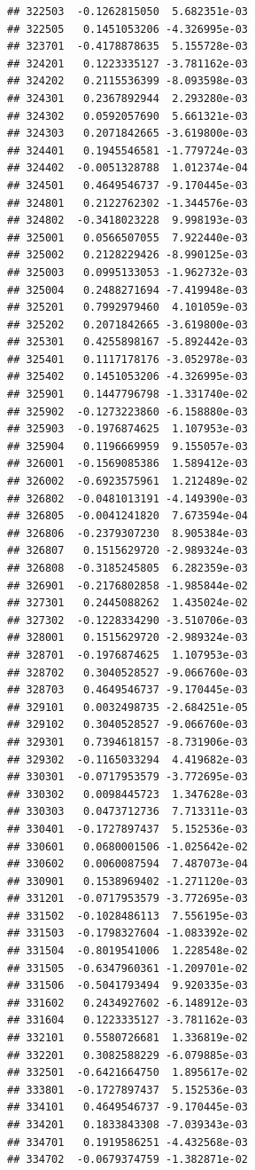 \begin{frame}[fragile]
\begin{verbatim}
## 322503  -0.1262815050  5.682351e-03
## 322505   0.1451053206 -4.326995e-03
## 323701  -0.4178878635  5.155728e-03
## 324201   0.1223335127 -3.781162e-03
## 324202   0.2115536399 -8.093598e-03
## 324301   0.2367892944  2.293280e-03
## 324302   0.0592057690  5.661321e-03
## 324303   0.2071842665 -3.619800e-03
## 324401   0.1945546581 -1.779724e-03
## 324402  -0.0051328788  1.012374e-04
## 324501   0.4649546737 -9.170445e-03
## 324801   0.2122762302 -1.344576e-03
## 324802  -0.3418023228  9.998193e-03
## 325001   0.0566507055  7.922440e-03
## 325002   0.2128229426 -8.990125e-03
## 325003   0.0995133053 -1.962732e-03
## 325004   0.2488271694 -7.419948e-03
## 325201   0.7992979460  4.101059e-03
## 325202   0.2071842665 -3.619800e-03
## 325301   0.4255898167 -5.892442e-03
## 325401   0.1117178176 -3.052978e-03
## 325402   0.1451053206 -4.326995e-03
## 325901   0.1447796798 -1.331740e-02
## 325902  -0.1273223860 -6.158880e-03
## 325903  -0.1976874625  1.107953e-03
## 325904   0.1196669959  9.155057e-03
## 326001  -0.1569085386  1.589412e-03
## 326002  -0.6923575961  1.212489e-02
## 326802  -0.0481013191 -4.149390e-03
## 326805  -0.0041241820  7.673594e-04
## 326806  -0.2379307230  8.905384e-03
## 326807   0.1515629720 -2.989324e-03
## 326808  -0.3185245805  6.282359e-03
## 326901  -0.2176802858 -1.985844e-02
## 327301   0.2445088262  1.435024e-02
## 327302  -0.1228334290 -3.510706e-03
## 328001   0.1515629720 -2.989324e-03
## 328701  -0.1976874625  1.107953e-03
## 328702   0.3040528527 -9.066760e-03
## 328703   0.4649546737 -9.170445e-03
## 329101   0.0032498735 -2.684251e-05
## 329102   0.3040528527 -9.066760e-03
## 329301   0.7394618157 -8.731906e-03
## 329302  -0.1165033294  4.419682e-03
## 330301  -0.0717953579 -3.772695e-03
## 330302   0.0098445723  1.347628e-03
## 330303   0.0473712736  7.713311e-03
## 330401  -0.1727897437  5.152536e-03
## 330601   0.0680001506 -1.025642e-02
## 330602   0.0060087594  7.487073e-04
## 330901   0.1538969402 -1.271120e-03
## 331201  -0.0717953579 -3.772695e-03
## 331502  -0.1028486113  7.556195e-03
## 331503  -0.1798327604 -1.083392e-02
## 331504  -0.8019541006  1.228548e-02
## 331505  -0.6347960361 -1.209701e-02
## 331506  -0.5041793494  9.920335e-03
## 331602   0.2434927602 -6.148912e-03
## 331604   0.1223335127 -3.781162e-03
## 332101   0.5580726681  1.336819e-02
## 332201   0.3082588229 -6.079885e-03
## 332501  -0.6421664750  1.895617e-02
## 333801  -0.1727897437  5.152536e-03
## 334101   0.4649546737 -9.170445e-03
## 334201   0.1833843308 -7.039343e-03
## 334701   0.1919586251 -4.432568e-03
## 334702  -0.0679374759 -1.382871e-02

\end{verbatim}
\end{frame}

